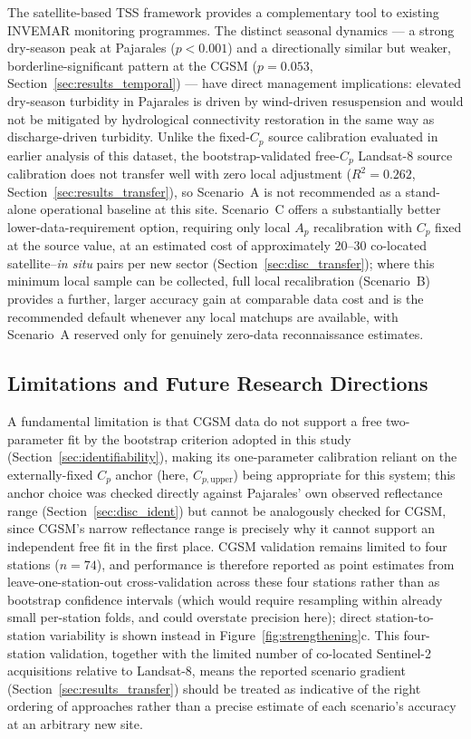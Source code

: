 \documentclass[remotesensing,article,submit,pdftex,moreauthors]{Definitions/mdpi}
\begin{document}
The satellite-based TSS framework provides a complementary tool to
existing INVEMAR monitoring programmes. The distinct seasonal dynamics
--- a strong dry-season peak at Pajarales ($p < 0.001$) and a directionally
similar but weaker, borderline-significant pattern at the CGSM
($p = 0.053$, Section~\ref{sec:results_temporal}) --- have direct management
implications: elevated dry-season turbidity in Pajarales is driven by
wind-driven resuspension and would not be mitigated by hydrological
connectivity restoration in the same way as discharge-driven turbidity.
Unlike the fixed-$C_p$ source calibration evaluated in earlier analysis
of this dataset, the bootstrap-validated free-$C_p$ Landsat-8 source
calibration does not transfer well with zero local adjustment
($R^2 = 0.262$, Section~\ref{sec:results_transfer}), so Scenario~A is
not recommended as a stand-alone operational baseline at this site.
Scenario~C offers a substantially better lower-data-requirement option,
requiring only local $A_p$ recalibration with $C_p$ fixed at the
source value, at an estimated cost of approximately 20--30 co-located
satellite--\textit{in situ} pairs per new sector
(Section~\ref{sec:disc_transfer}); where this minimum local sample can
be collected, full local recalibration (Scenario~B) provides a further,
larger accuracy gain at comparable data cost and is the recommended
default whenever any local matchups are available, with Scenario~A
reserved only for genuinely zero-data reconnaissance estimates.
 
 
\subsection{Limitations and Future Research Directions}
\label{sec:disc_limits}
 
A fundamental limitation is that CGSM data do not support a free
two-parameter fit by the bootstrap criterion adopted in this study
(Section~\ref{sec:identifiability}), making its one-parameter
calibration reliant
on the externally-fixed $C_p$ anchor (here, $C_{p,\text{upper}}$) being
appropriate for this system; this anchor choice was checked directly
against Pajarales' own observed reflectance range
(Section~\ref{sec:disc_ident}) but cannot be analogously checked for
CGSM, since CGSM's narrow reflectance range is precisely why it cannot
support an independent free fit in the first place. CGSM
validation remains limited to four stations ($n = 74$), and performance
is therefore reported as point estimates from leave-one-station-out
cross-validation across these four stations rather than as bootstrap
confidence intervals (which would require resampling within already
small per-station folds, and could overstate precision here);
direct station-to-station variability is shown instead in
Figure~\ref{fig:strengthening}c. This four-station validation,
together with the limited number of co-located Sentinel-2 acquisitions
relative to Landsat-8, means the reported scenario gradient
(Section~\ref{sec:results_transfer}) should be treated as indicative of
the right ordering of approaches rather than a precise estimate of
each scenario's accuracy at an arbitrary new site.
\end{document}
